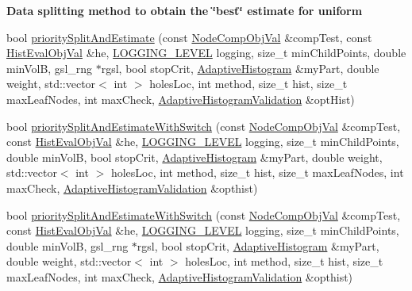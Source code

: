 \begin{Indent}{\bf \-Data splitting method to obtain the \char`\"{}best\char`\"{} estimate for uniform}
\begin{DoxyCompactItemize}
\item 
bool \hyperlink{classsubpavings_1_1AdaptiveHistogramValidation_ae982e9b5ffc50d9893a557a09bfc89af}{priority\-Split\-And\-Estimate} (const \hyperlink{classsubpavings_1_1NodeCompObjVal}{\-Node\-Comp\-Obj\-Val} \&comp\-Test, const \hyperlink{classsubpavings_1_1HistEvalObjVal}{\-Hist\-Eval\-Obj\-Val} \&he, \hyperlink{namespacesubpavings_aef8e51096b59ecaf1a1e9b2ee24b6089}{\-L\-O\-G\-G\-I\-N\-G\-\_\-\-L\-E\-V\-E\-L} logging, size\-\_\-t min\-Child\-Points, double min\-Vol\-B, gsl\-\_\-rng $\ast$rgsl, bool stop\-Crit, \hyperlink{classsubpavings_1_1AdaptiveHistogram}{\-Adaptive\-Histogram} \&my\-Part, double weight, std\-::vector$<$ int $>$ holes\-Loc, int method, size\-\_\-t hist, size\-\_\-t max\-Leaf\-Nodes, int max\-Check, \hyperlink{classsubpavings_1_1AdaptiveHistogramValidation}{\-Adaptive\-Histogram\-Validation} \&opt\-Hist)
\item 
bool \hyperlink{classsubpavings_1_1AdaptiveHistogramValidation_aabc3d1996ec2e9e1e227f6012c0c8f06}{priority\-Split\-And\-Estimate\-With\-Switch} (const \hyperlink{classsubpavings_1_1NodeCompObjVal}{\-Node\-Comp\-Obj\-Val} \&comp\-Test, const \hyperlink{classsubpavings_1_1HistEvalObjVal}{\-Hist\-Eval\-Obj\-Val} \&he, \hyperlink{namespacesubpavings_aef8e51096b59ecaf1a1e9b2ee24b6089}{\-L\-O\-G\-G\-I\-N\-G\-\_\-\-L\-E\-V\-E\-L} logging, size\-\_\-t min\-Child\-Points, double min\-Vol\-B, bool stop\-Crit, \hyperlink{classsubpavings_1_1AdaptiveHistogram}{\-Adaptive\-Histogram} \&my\-Part, double weight, std\-::vector$<$ int $>$ holes\-Loc, int method, size\-\_\-t hist, size\-\_\-t max\-Leaf\-Nodes, int max\-Check, \hyperlink{classsubpavings_1_1AdaptiveHistogramValidation}{\-Adaptive\-Histogram\-Validation} \&opthist)
\item 
bool \hyperlink{classsubpavings_1_1AdaptiveHistogramValidation_ae2684877f0996eea6f6593f1be2ab38a}{priority\-Split\-And\-Estimate\-With\-Switch} (const \hyperlink{classsubpavings_1_1NodeCompObjVal}{\-Node\-Comp\-Obj\-Val} \&comp\-Test, const \hyperlink{classsubpavings_1_1HistEvalObjVal}{\-Hist\-Eval\-Obj\-Val} \&he, \hyperlink{namespacesubpavings_aef8e51096b59ecaf1a1e9b2ee24b6089}{\-L\-O\-G\-G\-I\-N\-G\-\_\-\-L\-E\-V\-E\-L} logging, size\-\_\-t min\-Child\-Points, double min\-Vol\-B, gsl\-\_\-rng $\ast$rgsl, bool stop\-Crit, \hyperlink{classsubpavings_1_1AdaptiveHistogram}{\-Adaptive\-Histogram} \&my\-Part, double weight, std\-::vector$<$ int $>$ holes\-Loc, int method, size\-\_\-t hist, size\-\_\-t max\-Leaf\-Nodes, int max\-Check, \hyperlink{classsubpavings_1_1AdaptiveHistogramValidation}{\-Adaptive\-Histogram\-Validation} \&opthist)

\end{DoxyCompactItemize}
\end{Indent}
